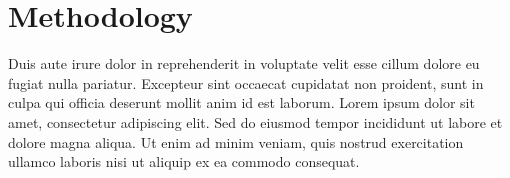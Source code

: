 %
\chapter{Methodology}
\label{c:2} 
%
Duis aute irure dolor in reprehenderit in voluptate velit esse cillum dolore eu fugiat nulla pariatur.
Excepteur sint occaecat cupidatat non proident, sunt in culpa qui officia deserunt mollit anim id est laborum.
Lorem ipsum dolor sit amet, consectetur adipiscing elit. 
Sed do eiusmod tempor incididunt ut labore et dolore magna aliqua. 
Ut enim ad minim veniam, quis nostrud exercitation ullamco laboris nisi ut aliquip ex ea commodo consequat.
%
%
